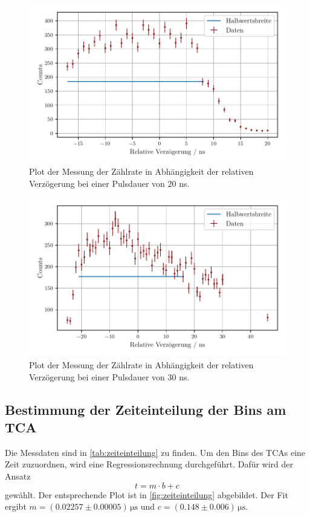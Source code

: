 \begin{figure}
    \centering
    \includegraphics[width = 0.7 \linewidth]{build/20ns_plot.pdf}
    \caption{Plot der Messung der Zählrate in Abhängigkeit der relativen Verzögerung bei einer Pulsdauer von $20$ ns.}
    \label{fig:20ns_plot}
\end{figure}

\begin{figure}
    \centering
    \includegraphics[width = 0.7 \linewidth]{build/30ns_plot.pdf}
    \caption{Plot der Messung der Zählrate in Abhängigkeit der relativen Verzögerung bei einer Pulsdauer von $30$ ns.}
    \label{fig:30ns_plot}
\end{figure}

\subsection{Bestimmung der Zeiteinteilung der Bins am TCA} \label{sec:zeiteinteilung}

Die Messdaten sind in \autoref{tab:zeiteinteilung} zu finden.
Um den Bins des TCAs eine Zeit zuzuordnen, wird eine Regressionsrechnung durchgeführt.
Dafür wird der Ansatz
\begin{equation*}
    t = m \cdot b + c
\end{equation*}
gewählt.
Der entsprechende Plot ist in \autoref{fig:zeiteinteilung} abgebildet.
Der Fit ergibt 
$m = (0.02257 \pm 0.00005) \, \unit{\micro\second}$ und $c = (0.148 \pm 0.006) \, \unit{\micro\second}$.


